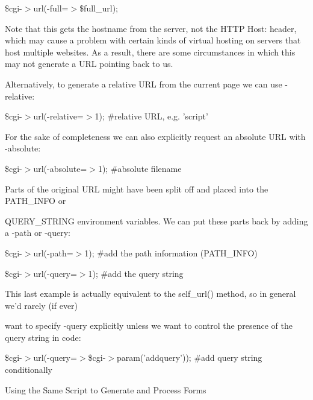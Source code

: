 \documentclass[a4paper,11pt]{book}
\begin{document}
\noindent \$cgi-$>$url(-full=$>$\$full\_url);

\noindent 

\noindent Note that this gets the hostname from the server, not the HTTP Host: header, which may cause a problem with certain kinds of virtual hosting on servers that host multiple websites. As a result, there are some circumstances in which this may not generate a URL pointing back to us.

\noindent 

\noindent Alternatively, to generate a relative URL from the current page we can use -relative:

\noindent 

\noindent 

\noindent \$cgi-$>$url(-relative=$>$1); \#relative URL, e.g. 'script'

\noindent 

\noindent For the sake of completeness we can also explicitly request an absolute URL with -absolute:

\noindent 

\noindent 

\noindent \$cgi-$>$url(-absolute=$>$1); \#absolute filename

\noindent 

\noindent Parts of the original URL might have been split off and placed into the PATH\_INFO or

\noindent QUERY\_STRING environment variables. We can put these parts back by adding a -path or -query:

\noindent 

\noindent \$cgi-$>$url(-path=$>$1); \#add the path information (PATH\_INFO)

\noindent \$cgi-$>$url(-query=$>$1); \#add the query string

\noindent 

\noindent This last example is actually equivalent to the self\_url() method, so in general we'd rarely (if ever)

\noindent want to specify -query explicitly unless we want to control the presence of the query string in code:

\noindent 

\noindent 

\noindent \$cgi-$>$url(-query=$>$\$cgi-$>$param('addquery')); \#add query string conditionally

\noindent 

\noindent 

\noindent Using the Same Script to Generate and Process Forms
\end{document}
